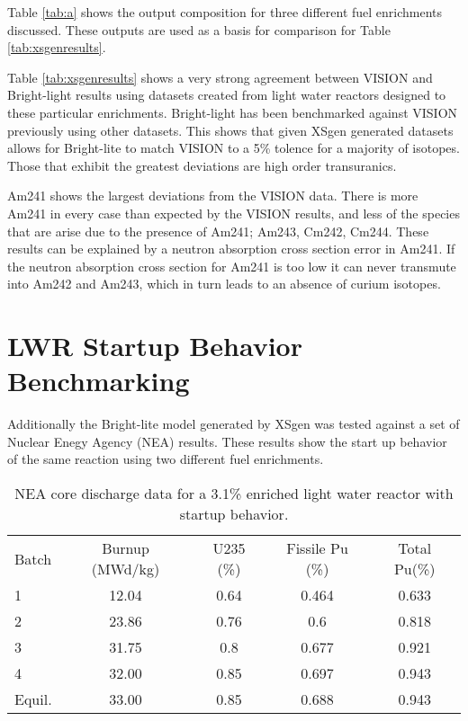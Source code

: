 \documentclass{article}
\begin{document}
Table \ref{tab:a} shows the output composition for three different fuel enrichments discussed. These outputs are used as a basis for comparison for Table \ref{tab:xsgenresults}.

Table \ref{tab:xsgenresults} shows a very strong agreement between VISION and Bright-light results using datasets created from light water reactors designed to these particular enrichments. Bright-light has been benchmarked against VISION previously using other datasets. This shows that given XSgen generated datasets allows for Bright-lite to match VISION to a 5\% tolence for a majority of isotopes. Those that exhibit the greatest deviations are high order transuranics.

Am241 shows the largest deviations from the VISION data. There is more Am241 in every case than expected by the VISION results, and less of the species that are arise due to the presence of Am241; Am243, Cm242, Cm244. These results can be explained by a neutron absorption cross section error in Am241. If the neutron absorption cross section for Am241 is too low it can never transmute into Am242 and Am243, which in turn leads to an absence of curium isotopes.

\section{LWR Startup Behavior Benchmarking}
Additionally the Bright-lite model generated by XSgen was tested against a set of Nuclear Enegy Agency (NEA) results\cite{nea}. These results show the start up behavior of the same reaction using two different fuel enrichments.
\begin{table}[!htb]
\centering
\caption{NEA core discharge data for a 3.1\% enriched light water reactor with startup behavior.}
\label{tab:b}
\begin{tabular}{lcccc}
Batch & Burnup (MWd/kg) & U235 (\%) & Fissile Pu (\%) & Total Pu(\%) \\
1 & 12.04 & 0.64 & 0.464 & 0.633 \\
2 & 23.86 & 0.76 & 0.6 & 0.818 \\
3 & 31.75 & 0.8 & 0.677 & 0.921 \\
4 & 32.00 & 0.85 & 0.697 & 0.943 \\
Equil. & 33.00 & 0.85 & 0.688 & 0.943
\end{tabular}
\end{table}
\end{document}

